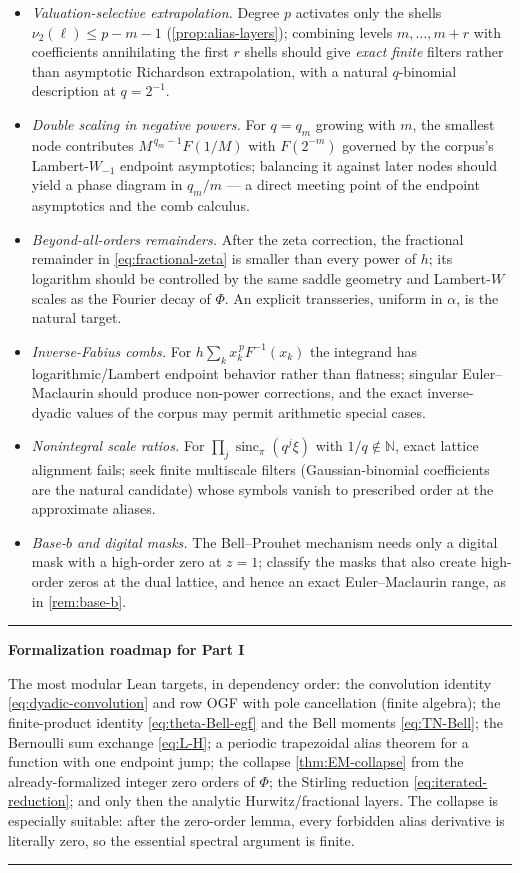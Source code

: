 \documentclass[11pt,oneside]{article}
\numberwithin{equation}{section}
\theoremstyle{definition}
\theoremstyle{remark}
\newcommand{\N}{\mathbb N}
\newcommand{\sincpi}{\operatorname{sinc}_{\pi}}
\newcommand{\vtwo}{\nu_2}
\newenvironment{statusbox}[1]{%
  \par\smallskip\noindent\begin{center}\begin{minipage}{0.94\textwidth}%
  \hrule\vspace{0.5em}\noindent\textbf{#1}\par\smallskip
}{%
  \vspace{0.5em}\hrule\end{minipage}\end{center}\smallskip
}
\begin{document}
\begin{itemize}
\item\emph{Valuation-selective extrapolation.}  Degree $p$ activates
only the shells $\vtwo(\ell)\le p-m-1$
(\cref{prop:alias-layers}); combining levels $m,\dots,m+r$ with
coefficients annihilating the first $r$ shells should give
\emph{exact finite} filters rather than asymptotic Richardson
extrapolation, with a natural $q$-binomial description at
$q=2^{-1}$.
\item\emph{Double scaling in negative powers.}  For $q=q_m$ growing
with $m$, the smallest node contributes
$M^{\,q_m-1}F(1/M)$ with $F(2^{-m})$ governed by the corpus's
Lambert-$W_{-1}$ endpoint asymptotics; balancing it against later
nodes should yield a phase diagram in $q_m/m$ --- a direct meeting
point of the endpoint asymptotics and the comb calculus.
\item\emph{Beyond-all-orders remainders.}  After the zeta correction,
the fractional remainder in \eqref{eq:fractional-zeta} is smaller
than every power of $h$; its logarithm should be controlled by the
same saddle geometry and Lambert-$W$ scales as the Fourier decay of
$\Phi$.  An explicit transseries, uniform in $\alpha$, is the
natural target.
\item\emph{Inverse-Fabius combs.}  For
$h\sum_k x_k^{\,p}F^{-1}(x_k)$ the integrand has
logarithmic/Lambert endpoint behavior rather than flatness; singular
Euler--Maclaurin should produce non-power corrections, and the exact
inverse-dyadic values of the corpus may permit arithmetic special
cases.
\item\emph{Nonintegral scale ratios.}  For
$\prod_j\sincpi(q^{j}\xi)$ with $1/q\notin\N$, exact lattice
alignment fails; seek finite multiscale filters (Gaussian-binomial
coefficients are the natural candidate) whose symbols vanish to
prescribed order at the approximate aliases.
\item\emph{Base-$b$ and digital masks.}  The Bell--Prouhet mechanism
needs only a digital mask with a high-order zero at $z=1$; classify
the masks that also create high-order zeros at the dual lattice, and
hence an exact Euler--Maclaurin range, as in \cref{rem:base-b}.
\end{itemize}

\begin{statusbox}{Formalization roadmap for Part I}
The most modular Lean targets, in dependency order: the convolution
identity \eqref{eq:dyadic-convolution} and row OGF with pole
cancellation (finite algebra); the finite-product identity
\eqref{eq:theta-Bell-egf} and the Bell moments \eqref{eq:TN-Bell};
the Bernoulli sum exchange \eqref{eq:L-H}; a periodic trapezoidal
alias theorem for a function with one endpoint jump; the collapse
\cref{thm:EM-collapse} from the already-formalized integer zero
orders of $\Phi$; the Stirling reduction
\eqref{eq:iterated-reduction}; and only then the analytic
Hurwitz/fractional layers.  The collapse is especially suitable: after
the zero-order lemma, every forbidden alias derivative is literally
zero, so the essential spectral argument is finite.
\end{statusbox}
\end{document}

